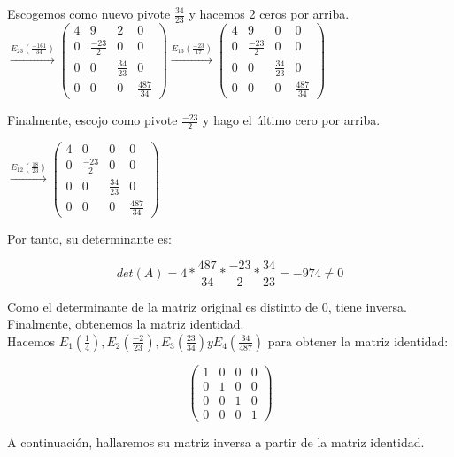 \documentclass[11pt, a4paper]{article}
\newif\IfInSansMode
\theoremstyle{theorem-style}
\theoremstyle{definition-style}
\theoremstyle{remark-style}
\theoremstyle{example-style}
\begin{document}
Escogemos como nuevo pivote $\frac{34}{23}$ y hacemos 2 ceros por arriba. \\

$\xrightarrow{E_{23}(\frac{-161}{34})}
\begin{pmatrix}
4 & 9 & 2 & 0 \\
0 & \frac{-23}{2} & 0 & 0 \\
0 & 0 & \frac{34}{23} & 0 \\
0 & 0 & 0 & \frac{487}{34}
\end{pmatrix}
\xrightarrow{E_{13}(\frac{-23}{17})}
\begin{pmatrix}
4 & 9 & 0 & 0 \\
0 & \frac{-23}{2} & 0 & 0 \\
0 & 0 & \frac{34}{23} & 0 \\
0 & 0 & 0 & \frac{487}{34}
\end{pmatrix}$

Finalmente, escojo como pivote $\frac{-23}{2}$ y hago el último cero por arriba.

$\xrightarrow{E_{12}(\frac{18}{23})}
\begin{pmatrix}
	4 & 0 & 0 & 0 \\
	0 & \frac{-23}{2} & 0 & 0 \\
	0 & 0 & \frac{34}{23} & 0 \\
	0 & 0 & 0 & \frac{487}{34}
\end{pmatrix}$

Por tanto, su determinante es:

$$det(A) = 4 * \frac{487}{34} * \frac{-23}{2} * \frac{34}{23} = -974 \ne 0
$$

Como el determinante de la matriz original es distinto de $0$, tiene inversa. Finalmente, obtenemos la matriz identidad. \\

Hacemos $E_1(\frac{1}{4}),E_2(\frac{-2}{23}),E_3(\frac{23}{34}) y E_4(\frac{34}{487})$ para obtener la matriz identidad:  

$$
\begin{pmatrix}
	1 & 0 & 0 & 0 \\
	0 & 1 & 0 & 0 \\
	0 & 0 & 1 & 0 \\
	0 & 0 & 0 & 1
\end{pmatrix}$$ 

A continuación, hallaremos su matriz inversa a partir de la matriz identidad. \\
\end{document}
